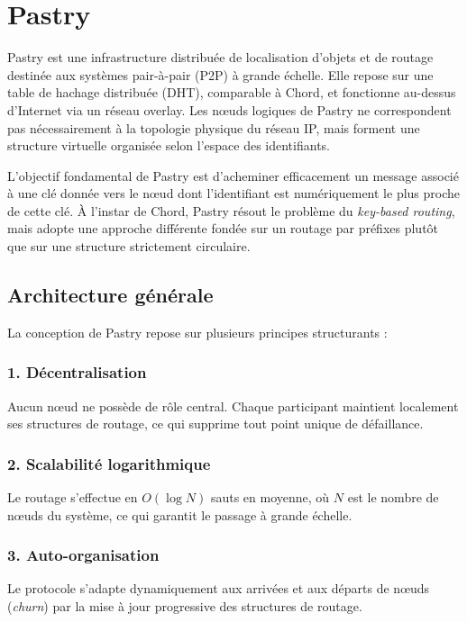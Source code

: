 \section{Pastry}

Pastry est une infrastructure distribuée de localisation d’objets et de routage destinée aux systèmes pair-à-pair (P2P) à grande échelle. Elle repose sur une table de hachage distribuée (DHT), comparable à Chord, et fonctionne au-dessus d’Internet via un réseau overlay. Les nœuds logiques de Pastry ne correspondent pas nécessairement à la topologie physique du réseau IP, mais forment une structure virtuelle organisée selon l’espace des identifiants.

L’objectif fondamental de Pastry est d’acheminer efficacement un message associé à une clé donnée vers le nœud dont l’identifiant est numériquement le plus proche de cette clé. À l’instar de Chord, Pastry résout le problème du \textit{key-based routing}, mais adopte une approche différente fondée sur un routage par préfixes plutôt que sur une structure strictement circulaire.

\subsection{Architecture générale}

La conception de Pastry repose sur plusieurs principes structurants :

\subsubsection*{1. Décentralisation}
Aucun nœud ne possède de rôle central. Chaque participant maintient localement ses structures de routage, ce qui supprime tout point unique de défaillance.

\subsubsection*{2. Scalabilité logarithmique}
Le routage s’effectue en $O(\log N)$ sauts en moyenne, où $N$ est le nombre de nœuds du système, ce qui garantit le passage à grande échelle.

\subsubsection*{3. Auto-organisation}
Le protocole s’adapte dynamiquement aux arrivées et aux départs de nœuds (\textit{churn}) par la mise à jour progressive des structures de routage.

